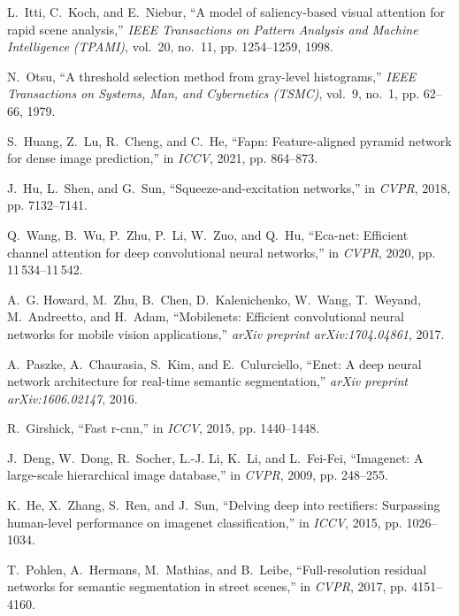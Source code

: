 \documentclass[10.5pt,twocolumn,journal,letterpaper]{IEEEtran}
\begin{document}
\begin{thebibliography}{10}
	L.~Itti, C.~Koch, and E.~Niebur, ``A model of saliency-based visual attention
	for rapid scene analysis,'' \emph{IEEE Transactions on Pattern Analysis and
		Machine Intelligence (TPAMI)}, vol.~20, no.~11, pp. 1254--1259, 1998.
	
	N.~Otsu, ``A threshold selection method from gray-level histograms,''
	\emph{IEEE Transactions on Systems, Man, and Cybernetics (TSMC)}, vol.~9,
	no.~1, pp. 62--66, 1979.
	
	S.~Huang, Z.~Lu, R.~Cheng, and C.~He, ``Fapn: Feature-aligned pyramid network
	for dense image prediction,'' in \emph{ICCV}, 2021, pp. 864--873.
	
	J.~Hu, L.~Shen, and G.~Sun, ``Squeeze-and-excitation networks,'' in
	\emph{CVPR}, 2018, pp. 7132--7141.
	
	Q.~Wang, B.~Wu, P.~Zhu, P.~Li, W.~Zuo, and Q.~Hu, ``Eca-net: Efficient channel
	attention for deep convolutional neural networks,'' in \emph{CVPR}, 2020, pp.
	11\,534--11\,542.
	
	A.~G. Howard, M.~Zhu, B.~Chen, D.~Kalenichenko, W.~Wang, T.~Weyand,
	M.~Andreetto, and H.~Adam, ``Mobilenets: Efficient convolutional neural
	networks for mobile vision applications,'' \emph{arXiv preprint
		arXiv:1704.04861}, 2017.
	
	A.~Paszke, A.~Chaurasia, S.~Kim, and E.~Culurciello, ``Enet: A deep neural
	network architecture for real-time semantic segmentation,'' \emph{arXiv
		preprint arXiv:1606.02147}, 2016.
	
	R.~Girshick, ``Fast r-cnn,'' in \emph{ICCV}, 2015, pp. 1440--1448.
	
	J.~Deng, W.~Dong, R.~Socher, L.-J. Li, K.~Li, and L.~Fei-Fei, ``Imagenet: A
	large-scale hierarchical image database,'' in \emph{CVPR}, 2009, pp.
	248--255.
	
	K.~He, X.~Zhang, S.~Ren, and J.~Sun, ``Delving deep into rectifiers: Surpassing
	human-level performance on imagenet classification,'' in \emph{ICCV}, 2015,
	pp. 1026--1034.
	
	T.~Pohlen, A.~Hermans, M.~Mathias, and B.~Leibe, ``Full-resolution residual
	networks for semantic segmentation in street scenes,'' in \emph{CVPR}, 2017,
	pp. 4151--4160.
	

\end{thebibliography}
\end{document}
